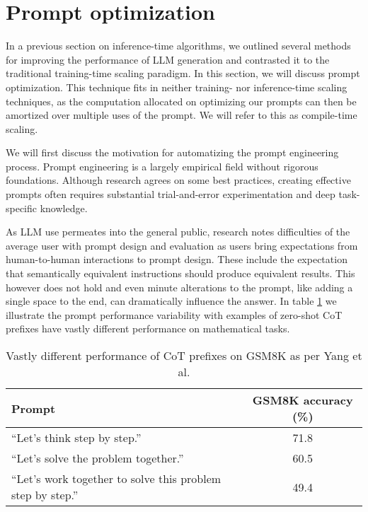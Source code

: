 \section{Prompt optimization}
In a previous section on inference-time algorithms, we outlined several methods for improving the performance of LLM generation
and contrasted it to the traditional training-time scaling paradigm. In this section, we will discuss prompt optimization. 
This technique fits in neither training- nor inference-time scaling techniques, as the computation allocated on
optimizing our prompts can then be amortized over multiple uses of the prompt. 
We will refer to this as compile-time\cite{schnabel2024symbolicpromptprogramsearch} scaling.

We will first discuss the motivation for automatizing the prompt engineering process. 
Prompt engineering is a largely empirical field without rigorous foundations.
Although research agrees on some best practices, creating effective prompts 
often requires substantial trial-and-error experimentation and deep task-specific 
knowledge\cite{xiang2025selfsupervisedpromptoptimization}.

As LLM use permeates into the general public, research\cite{10.1145/3544548.3581388} notes difficulties 
of the average user with prompt design and evaluation as users bring expectations from human-to-human 
interactions to prompt design. These include the expectation that semantically equivalent instructions 
should produce equivalent results. This however does not hold and even minute
alterations to the prompt, like adding a single space to the end, can dramatically influence the answer\cite{zhuo2024prosaassessingunderstandingprompt}\cite{salinas2024butterflyeffectalteringprompts}.
In table \ref{tab:cotprefixperf} we illustrate the prompt performance variability with examples of zero-shot CoT\cite{NEURIPS2022_8bb0d291} prefixes have vastly different performance on mathematical tasks.

\begin{table}[htbp]
    \centering
    \caption{Vastly different performance of CoT prefixes on GSM8K as per Yang et al.\cite{yang2024largelanguagemodelsoptimizers}}
    \label{tab:cotprefixperf}
    \begin{tabularx}{\linewidth}{Xc}
    \toprule
    \textbf{Prompt} & \textbf{GSM8K accuracy (\%)} \\
    \midrule
    ``Let's think step by step.'' & 71.8 \\
    ``Let's solve the problem together.'' & 60.5 \\
    ``Let's work together to solve this problem step by step.'' & 49.4 \\
    \bottomrule
    \end{tabularx}
\end{table}

